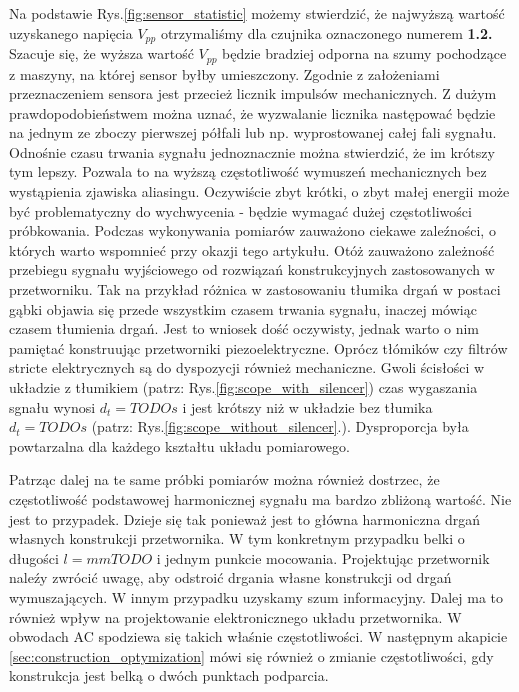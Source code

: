 Na podstawie Rys.\ref{fig:sensor_statistic} możemy stwierdzić, że najwyższą wartość uzyskanego napięcia $V_{pp}$ otrzymaliśmy dla czujnika oznaczonego numerem \textbf{1.2.} Szacuje się, że wyższa wartość $V_{pp}$ będzie bradziej odporna na szumy pochodzące z maszyny, na której sensor byłby umieszczony. Zgodnie z założeniami przeznaczeniem sensora jest przecież licznik impulsów mechanicznych. Z dużym prawdopodobieństwem można uznać, że wyzwalanie licznika następować będzie na jednym ze zboczy pierwszej półfali lub np. wyprostowanej całej fali sygnału. 
\indent Odnośnie czasu trwania sygnału jednoznacznie można stwierdzić, że im krótszy tym lepszy. Pozwala to na wyższą częstotliwość wymuszeń mechanicznych bez wystąpienia zjawiska aliasingu. Oczywiście zbyt krótki, o zbyt małej energii może być problematyczny do wychwycenia - będzie wymagać dużej częstotliwości próbkowania.
\indent Podczas wykonywania pomiarów zauważono ciekawe zaleźności, o których warto wspomnieć przy okazji tego artykułu. Otóż zauważono zależność przebiegu sygnału wyjściowego od rozwiązań konstrukcyjnych zastosowanych w przetworniku. Tak na przykład różnica w zastosowaniu tłumika drgań w postaci gąbki objawia się przede wszystkim czasem trwania sygnału, inaczej mówiąc czasem tłumienia drgań. Jest to wniosek dość oczywisty, jednak warto o nim pamiętać konstruując przetworniki piezoelektryczne. Oprócz tłómików czy filtrów stricte elektrycznych są do dyspozycji również mechaniczne. Gwoli ścisłości w układzie z tłumikiem (patrz: Rys.\ref{fig:scope_with_silencer}) czas wygaszania sgnału wynosi $d_t = TODOs$ i jest krótszy niż w układzie bez tłumika $d_t = TODOs$ (patrz: Rys.\ref{fig:scope_without_silencer}.). Dysproporcja była powtarzalna dla każdego kształtu układu pomiarowego.

\indent Patrząc dalej na te same próbki pomiarów można również dostrzec, że częstotliwość podstawowej harmonicznej sygnału ma bardzo zbliżoną wartość. Nie jest to przypadek. Dzieje się tak ponieważ jest to główna harmoniczna drgań własnych konstrukcji przetwornika. W tym konkretnym przypadku belki o długości $l = mmTODO$ i jednym punkcie mocowania. Projektując przetwornik naleźy zwrócić uwagę, aby odstroić drgania własne konstrukcji od drgań wymuszających. W innym przypadku uzyskamy szum informacyjny. Dalej ma to również wpływ na projektowanie elektronicznego układu przetwornika. W obwodach AC spodziewa się takich właśnie częstotliwości. W następnym akapicie \ref{sec:construction_optymization} mówi się również o zmianie częstotliwości, gdy konstrukcja jest belką o dwóch punktach podparcia. 


